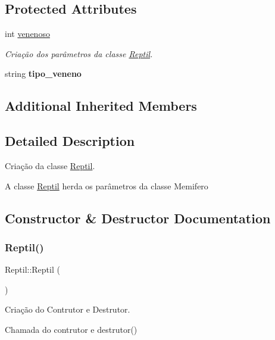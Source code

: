 \subsection*{Protected Attributes}
\begin{DoxyCompactItemize}
\item 
int \mbox{\hyperlink{class_reptil_ac194e65b0de8ab94dd6ce75e889ba8a8}{venenoso}}
\begin{DoxyCompactList}\small\item\em Criação dos parâmetros da classe \mbox{\hyperlink{class_reptil}{Reptil}}. \end{DoxyCompactList}\item 
\mbox{\label{class_reptil_a231d711a23c8b52ffafc135eca7a080c}} 
string {\bfseries tipo\+\_\+veneno}
\end{DoxyCompactItemize}
\subsection*{Additional Inherited Members}


\subsection{Detailed Description}
Criação da classe \mbox{\hyperlink{class_reptil}{Reptil}}. 

A classe \mbox{\hyperlink{class_reptil}{Reptil}} herda os parâmetros da classe Memifero 

\subsection{Constructor \& Destructor Documentation}
\mbox{\label{class_reptil_a8d4e391e335678b7ed64eda95e050553}} 
\subsubsection{\texorpdfstring{Reptil()}{Reptil()}}
{\footnotesize\ttfamily Reptil\+::\+Reptil (\begin{DoxyParamCaption}{ }\end{DoxyParamCaption})}



Criação do Contrutor e Destrutor. 

Chamada do contrutor e destrutor() 

